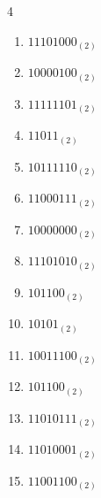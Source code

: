 \begin{multicols}{4}
\begin{enumerate}
        \phantom{$=130$}

  \item $11101000_{(2)}$

        \phantom{$=232$}

\columnbreak %

  \item $10000100_{(2)}$

        \phantom{$=132$}

  \item $11111101_{(2)}$

        \phantom{$=253$}

  \item $11011_{(2)}$

        \phantom{$=27$}

  \item $10111110_{(2)}$

        \phantom{$=190$}

  \item $11000111_{(2)}$

        \phantom{$=199$}

  \item $10000000_{(2)}$

        \phantom{$=128$}

  \item $11101010_{(2)}$

        \phantom{$=234$}

  \item $101100_{(2)}$

        \phantom{$=44$}

  \item $10101_{(2)}$

        \phantom{$=21$}

  \item $10011100_{(2)}$

        \phantom{$=156$}

  \item $101100_{(2)}$

        \phantom{$=44$}

  \item $11010111_{(2)}$

        \phantom{$=215$}

  \item $11010001_{(2)}$

        \phantom{$=209$}

  \item $11001100_{(2)}$


\end{enumerate}
\end{multicols}
